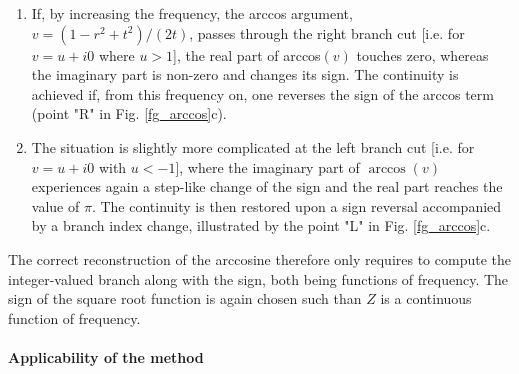 \begin{enumerate}
\item{
If, by increasing the frequency, the arccos argument, $v = (1 - r^2+t^2)/(2 t)$, passes through the right branch cut [i.e.  for $v= u+i 0$ where $u>1$], the real part of arccos$(v)$ touches zero, whereas the imaginary part is non-zero and changes its sign. The continuity is achieved if, from this frequency on, one reverses the sign of the arccos term (point "R" in Fig. \ref{fg_arccos}c). 
} 
\item{
The situation is slightly more complicated at the left branch cut [i.e. for $v = u+i 0$ with $u<-1$], where the imaginary part of $\arccos(v)$ experiences again a step-like change of the sign and the real part reaches the value of $\pi$. The continuity is then restored upon a sign reversal accompanied by a branch index change,  illustrated by the point "L" in Fig. \ref{fg_arccos}c. 
} 
 \end{enumerate}
The correct reconstruction of the arccosine therefore only requires to compute the integer-valued branch along with the sign, both being functions of frequency. The sign of the square root function is again chosen such than $Z$ is a continuous function of frequency.  


\paragraph{Applicability of the method}%



